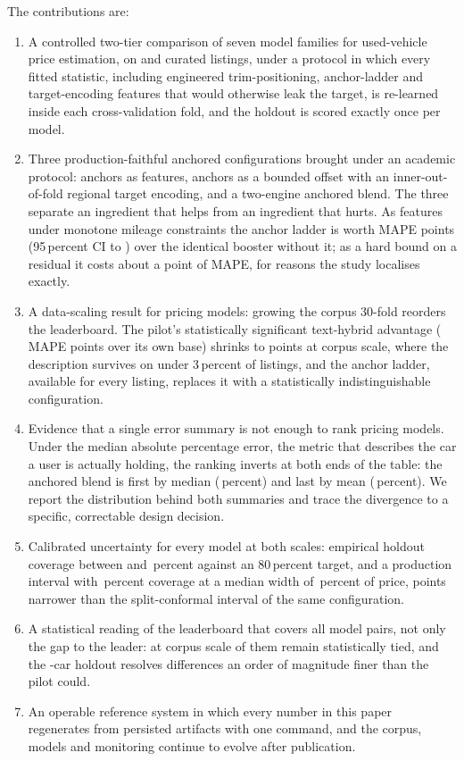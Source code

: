 \documentclass[journal,10pt]{IEEEtran}
\begin{document}
The contributions are:
\begin{enumerate}
\item A controlled two-tier comparison of seven model families for used-vehicle price estimation, on \PilotRows{} and \NRows{} curated listings, under a protocol in which every fitted statistic, including engineered trim-positioning, anchor-ladder and target-encoding features that would otherwise leak the target, is re-learned inside each cross-validation fold, and the holdout is scored exactly once per model.
\item Three production-faithful anchored configurations brought under an academic protocol: anchors as features, anchors as a bounded offset with an inner-out-of-fold regional target encoding, and a two-engine anchored blend. The three separate an ingredient that helps from an ingredient that hurts. As features under monotone mileage constraints the anchor ladder is worth \AnchorGain{} MAPE points (95\,percent CI \AnchorGainCILow{} to \AnchorGainCIHigh) over the identical booster without it; as a hard bound on a residual it costs about a point of MAPE, for reasons the study localises exactly.
\item A data-scaling result for pricing models: growing the corpus 30-fold reorders the leaderboard. The pilot's statistically significant text-hybrid advantage (\PilotTextGain{} MAPE points over its own base) shrinks to \TextGain{} points at corpus scale, where the description survives on under 3\,percent of listings, and the anchor ladder, available for every listing, replaces it with a statistically indistinguishable configuration.
\item Evidence that a single error summary is not enough to rank pricing models. Under the median absolute percentage error, the metric that describes the car a user is actually holding, the ranking inverts at both ends of the table: the anchored blend is first by median (\BestMedian\,percent) and last by mean (\BestMedianMape\,percent). We report the distribution behind both summaries and trace the divergence to a specific, correctable design decision.
\item Calibrated uncertainty for every model at both scales: empirical holdout coverage between \CovMin{} and \CovMax\,percent against an 80\,percent target, and a production interval with \CQRCoverage\,percent coverage at a median width of \CQRWidth\,percent of price, \CQRWidthGain{} points narrower than the split-conformal interval of the same configuration.
\item A statistical reading of the leaderboard that covers all \TotalPairs{} model pairs, not only the gap to the leader: at corpus scale \TiedPairs{} of them remain statistically tied, and the \NHoldout{}-car holdout resolves differences an order of magnitude finer than the pilot could.
\item An operable reference system in which every number in this paper regenerates from persisted artifacts with one command, and the corpus, models and monitoring continue to evolve after publication.
\end{enumerate}
\end{document}
